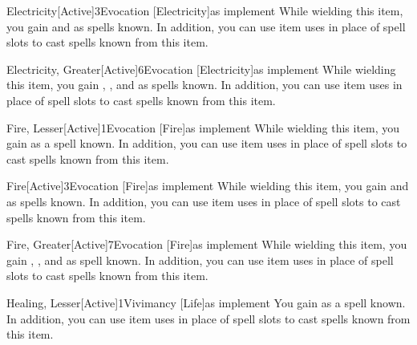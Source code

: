         \begin{magicitemdef}{Electricity}[Active]{3}{Evocation [Electricity]}{as implement}
             While wielding this item, you gain  and  as spells known.
            In addition, you can use item uses in place of spell slots to cast spells known from this item.
        \end{magicitemdef}

        \begin{magicitemdef}{Electricity, Greater}[Active]{6}{Evocation [Electricity]}{as implement}
             While wielding this item, you gain , , and  as spells known.
            In addition, you can use item uses in place of spell slots to cast spells known from this item.
        \end{magicitemdef}

        \begin{magicitemdef}{Fire, Lesser}[Active]{1}{Evocation [Fire]}{as implement}
             While wielding this item, you gain  as a spell known.
            In addition, you can use item uses in place of spell slots to cast spells known from this item.
        \end{magicitemdef}

        \begin{magicitemdef}{Fire}[Active]{3}{Evocation [Fire]}{as implement}
             While wielding this item, you gain  and  as spells known.
            In addition, you can use item uses in place of spell slots to cast spells known from this item.
        \end{magicitemdef}

        \begin{magicitemdef}{Fire, Greater}[Active]{7}{Evocation [Fire]}{as implement}
             While wielding this item, you gain , , and  as spell known.
            In addition, you can use item uses in place of spell slots to cast spells known from this item.
        \end{magicitemdef}

        \begin{magicitemdef}{Healing, Lesser}[Active]{1}{Vivimancy [Life]}{as implement}
             You gain  as a spell known.
            In addition, you can use item uses in place of spell slots to cast spells known from this item.
        \end{magicitemdef}

